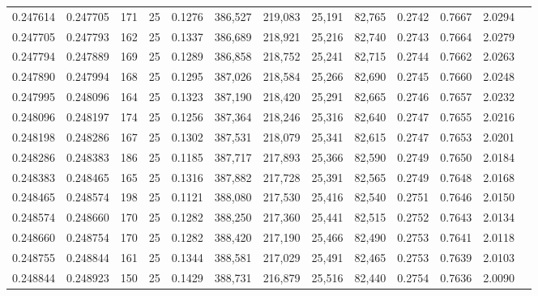 \begin{tabular}{rrrrrrrrrrrrr}
0.247614 & 0.247705 &   171 &  25 &                                     0.1276 & 386,527 & 219,083 &  25,191 &  82,765 & 0.2742 & 0.7667 & 2.0294 \\
0.247705 & 0.247793 &   162 &  25 &                                     0.1337 & 386,689 & 218,921 &  25,216 &  82,740 & 0.2743 & 0.7664 & 2.0279 \\
0.247794 & 0.247889 &   169 &  25 &                                     0.1289 & 386,858 & 218,752 &  25,241 &  82,715 & 0.2744 & 0.7662 & 2.0263 \\
0.247890 & 0.247994 &   168 &  25 &                                     0.1295 & 387,026 & 218,584 &  25,266 &  82,690 & 0.2745 & 0.7660 & 2.0248 \\
0.247995 & 0.248096 &   164 &  25 &                                     0.1323 & 387,190 & 218,420 &  25,291 &  82,665 & 0.2746 & 0.7657 & 2.0232 \\
0.248096 & 0.248197 &   174 &  25 &                                     0.1256 & 387,364 & 218,246 &  25,316 &  82,640 & 0.2747 & 0.7655 & 2.0216 \\
0.248198 & 0.248286 &   167 &  25 &                                     0.1302 & 387,531 & 218,079 &  25,341 &  82,615 & 0.2747 & 0.7653 & 2.0201 \\
0.248286 & 0.248383 &   186 &  25 &                                     0.1185 & 387,717 & 217,893 &  25,366 &  82,590 & 0.2749 & 0.7650 & 2.0184 \\
0.248383 & 0.248465 &   165 &  25 &                                     0.1316 & 387,882 & 217,728 &  25,391 &  82,565 & 0.2749 & 0.7648 & 2.0168 \\
0.248465 & 0.248574 &   198 &  25 &                                     0.1121 & 388,080 & 217,530 &  25,416 &  82,540 & 0.2751 & 0.7646 & 2.0150 \\
0.248574 & 0.248660 &   170 &  25 &                                     0.1282 & 388,250 & 217,360 &  25,441 &  82,515 & 0.2752 & 0.7643 & 2.0134 \\
0.248660 & 0.248754 &   170 &  25 &                                     0.1282 & 388,420 & 217,190 &  25,466 &  82,490 & 0.2753 & 0.7641 & 2.0118 \\
0.248755 & 0.248844 &   161 &  25 &                                     0.1344 & 388,581 & 217,029 &  25,491 &  82,465 & 0.2753 & 0.7639 & 2.0103 \\
0.248844 & 0.248923 &   150 &  25 &                                     0.1429 & 388,731 & 216,879 &  25,516 &  82,440 & 0.2754 & 0.7636 & 2.0090 \\

\end{tabular}
